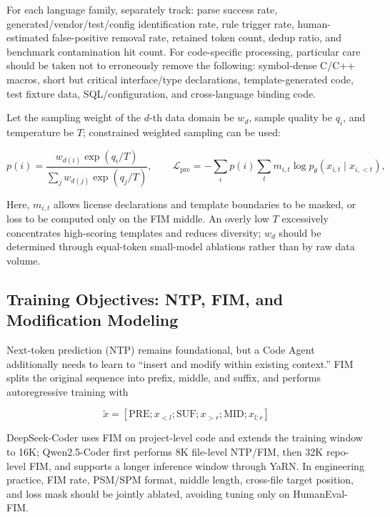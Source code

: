 \documentclass[10pt,a4paper,UTF8,fontset=none]{ctexart}
\begin{document}
For each language family, separately track: parse success rate, generated/vendor/test/config identification rate, rule trigger rate, human-estimated false-positive removal rate, retained token count, dedup ratio, and benchmark contamination hit count. For code-specific processing, particular care should be taken not to erroneously remove the following: symbol-dense C/C++ macros, short but critical interface/type declarations, template-generated code, test fixture data, SQL/configuration, and cross-language binding code.

Let the sampling weight of the $d$-th data domain be $w_d$, sample quality be $q_i$, and temperature be $T$; constrained weighted sampling can be used:

\begin{equation}
p(i)=\frac{w_{d(i)}\exp(q_i/T)}{\sum_j w_{d(j)}\exp(q_j/T)},
\qquad
\mathcal{L}_{\mathrm{pre}}=-\sum_i p(i)\sum_t m_{i,t}\log p_\theta(x_{i,t}\mid x_{i,<t}),
\label{en:eq:pretrain}
\end{equation}

Here, $m_{i,t}$ allows license declarations and template boundaries to be masked, or loss to be computed only on the FIM middle. An overly low $T$ excessively concentrates high-scoring templates and reduces diversity; $w_d$ should be determined through equal-token small-model ablations rather than by raw data volume.

\subsection{Training Objectives: NTP, FIM, and Modification Modeling}

Next-token prediction (NTP) remains foundational, but a Code Agent additionally needs to learn to ``insert and modify within existing context.'' FIM splits the original sequence into prefix, middle, and suffix, and performs autoregressive training with

\begin{equation}
\tilde{x}=[\mathrm{PRE};x_{<l};\mathrm{SUF};x_{>r};\mathrm{MID};x_{l:r}]
\label{en:eq:fim}
\end{equation}

DeepSeek-Coder uses FIM on project-level code and extends the training window to 16K\cite{en:guo2024deepseekcoder}; Qwen2.5-Coder first performs 8K file-level NTP/FIM, then 32K repo-level FIM, and supports a longer inference window through YaRN\cite{en:hui2024qwen25coder}. In engineering practice, FIM rate, PSM/SPM format, middle length, cross-file target position, and loss mask should be jointly ablated, avoiding tuning only on HumanEval-FIM.
\end{document}
